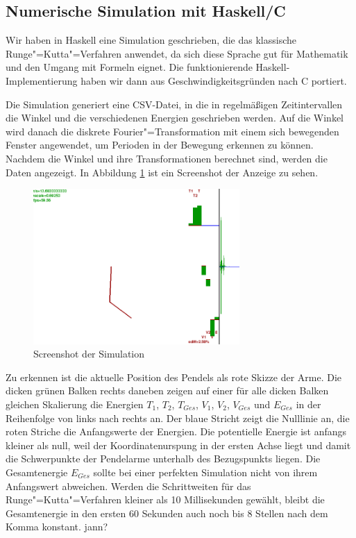 \subsection{Numerische Simulation mit Haskell/C}

Wir haben in Haskell eine Simulation geschrieben, die das klassische Runge"=Kutta"=Verfahren anwendet, da sich diese Sprache gut für Mathematik und den Umgang mit Formeln eignet. Die funktionierende Haskell-Implementierung haben wir dann aus Geschwindigkeitsgründen nach C portiert.

Die Simulation generiert eine CSV-Datei, in die in regelmäßigen Zeitintervallen die Winkel und die verschiedenen Energien geschrieben werden.
Auf die Winkel wird danach die diskrete Fourier"=Transformation mit einem sich bewegenden Fenster angewendet, um Perioden in der Bewegung erkennen zu können.
Nachdem die Winkel und ihre Transformationen berechnet sind, werden die Daten angezeigt.
In Abbildung \ref{fig:hssim} ist ein Screenshot der Anzeige zu sehen.

\begin{figure}[bht]
  \centering
  \includegraphics[width=0.7\textwidth]{images/haskell_simulation_fwindow1000_whitebg_cropped.png}
  \caption{Screenshot der Simulation}
  \label{fig:hssim}
\end{figure}

Zu erkennen ist die aktuelle Position des Pendels als rote Skizze der Arme.
Die dicken grünen Balken rechts daneben zeigen auf einer für alle dicken Balken gleichen Skalierung die Energien $T_1$, $T_2$, $T_{Ges}$, $V_1$, $V_2$, $V_{Ges}$ und $E_{Ges}$ in der Reihenfolge von links nach rechts an.
Der blaue Stricht zeigt die Nulllinie an, die roten Striche die Anfangswerte der Energien.
Die potentielle Energie ist anfangs kleiner als null, weil der Koordinatenurspung in der ersten Achse liegt und damit die Schwerpunkte der Pendelarme unterhalb des Bezugspunkts liegen.
Die Gesamtenergie $E_{Ges}$ sollte bei einer perfekten Simulation nicht von ihrem Anfangswert abweichen.
Werden die Schrittweiten für das Runge"=Kutta"=Verfahren kleiner als 10 Millisekunden gewählt, bleibt die Gesamtenergie in den ersten 60 Sekunden auch noch bis 8 Stellen nach dem Komma konstant. \TODO jann?

